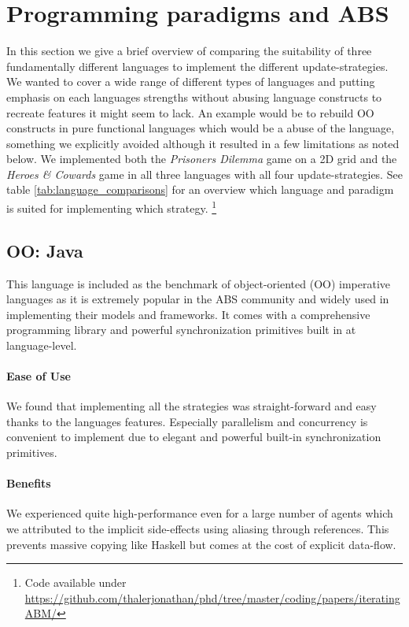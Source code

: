 \section{Programming paradigms and ABS}
In this section we give a brief overview of comparing the suitability of three fundamentally different languages to implement the different update-strategies. We wanted to cover a wide range of different types of languages and putting emphasis on each languages strengths without abusing language constructs to recreate features it might seem to lack. An example would be to rebuild OO constructs in pure functional languages which would be a abuse of the language, something we explicitly avoided although it resulted in a few limitations as noted below. We implemented both the \textit{Prisoners Dilemma} game on a 2D grid and the \textit{Heroes \& Cowards} game in all three languages with all four update-strategies. See table \ref{tab:language_comparisons} for an overview which language and paradigm is suited for implementing which strategy. \footnote{Code available under\\ \url{https://github.com/thalerjonathan/phd/tree/master/coding/papers/iteratingABM/}}

\subsection{OO: Java}
This language is included as the benchmark of object-oriented (OO) imperative languages as it is extremely popular in the ABS community and widely used in implementing their models and frameworks. It comes with a comprehensive programming library and powerful synchronization primitives built in at language-level.

\paragraph{Ease of Use}
We found that implementing all the strategies was straight-forward and easy thanks to the languages features. Especially parallelism and concurrency is convenient to implement due to elegant and powerful built-in synchronization primitives.

\paragraph{Benefits}
We experienced quite high-performance even for a large number of agents which we attributed to the implicit side-effects using aliasing through references. This prevents massive copying like Haskell but comes at the cost of explicit data-flow.

